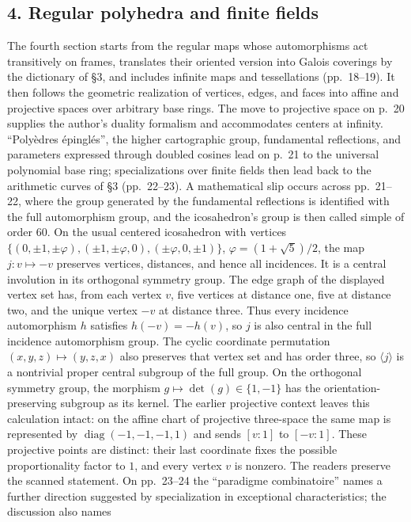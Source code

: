 \subsection*{4. Regular polyhedra and finite fields}
The fourth section starts from the regular maps whose automorphisms act
transitively on frames, translates their oriented version into Galois
coverings by the dictionary of \S3, and includes infinite maps and
tessellations (pp.~18--19). It then follows the geometric realization of
vertices, edges, and faces into affine and projective spaces over arbitrary
base rings. The move to projective space on p.~20 supplies the author's
duality formalism and accommodates centers at infinity. ``Polyèdres
épinglés'', the higher cartographic group, fundamental reflections, and
parameters expressed through doubled cosines lead on p.~21 to the
universal polynomial base ring; specializations over finite fields then
lead back to the arithmetic curves of \S3 (pp.~22--23). A mathematical
slip occurs across pp.~21--22, where the group generated by the fundamental
reflections is identified with the full automorphism group, and the
icosahedron's group is then called simple of order 60. On the usual
centered icosahedron with vertices
$\{(0,\pm1,\pm\varphi),(\pm1,\pm\varphi,0),(\pm\varphi,0,\pm1)\}$,
$\varphi=(1+\sqrt5)/2$, the map $j:v\mapsto-v$ preserves vertices,
distances, and hence all incidences. It is a central involution in its
orthogonal symmetry group. The edge graph of the displayed vertex set
has, from each vertex $v$, five vertices at distance one, five at
distance two, and the unique vertex $-v$ at distance three. Thus every
incidence automorphism $h$ satisfies $h(-v)=-h(v)$, so $j$ is also
central in the full incidence automorphism group. The cyclic coordinate permutation
$(x,y,z)\mapsto(y,z,x)$ also preserves that vertex set and has order three,
so $\langle j\rangle$ is a nontrivial proper central subgroup of the full
group. On the orthogonal symmetry group, the morphism
$g\mapsto\det(g)\in\{1,-1\}$ has the orientation-preserving subgroup
as its kernel. The earlier projective
context leaves this calculation intact: on the affine chart of projective
three-space the same map is represented by
$\operatorname{diag}(-1,-1,-1,1)$ and sends $[v:1]$ to $[-v:1]$.
These projective points are distinct: their last coordinate fixes the
possible proportionality factor to $1$, and every vertex $v$ is nonzero.
The readers preserve the scanned statement. On pp.~23--24 the
``paradigme combinatoire'' names a further direction suggested by
specialization in exceptional characteristics; the discussion also names
